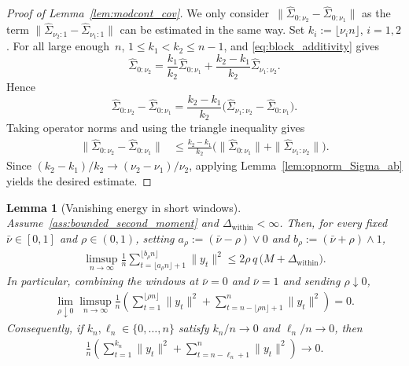 \documentclass[10pt, letterpaper]{amsart}
\newtheorem{lem}[theorem]{Lemma}
\begin{document}
\begin{proof}[Proof of Lemma~\ref{lem:modcont_cov}]
We only consider~$ \|\widehat\Sigma_{0:\nu_2 }-\widehat\Sigma_{0: \nu_1 } \|$ as the term $\|\widehat\Sigma_{\nu_2:1}-\widehat\Sigma_{\nu_1 :1} \|$ can be estimated in the same way.
Set $k_i:=\lfloor\nu_i n\rfloor$, $i=1,2$. For all large enough~$n$,
$1\leq k_1<k_2\leq n-1$, and  \eqref{eq:block_additivity} gives
\[
\widehat\Sigma_{0: \nu_2}
=
\frac{k_1}{k_2}\widehat\Sigma_{0: \nu_1}
+\frac{k_2-k_1}{k_2}\widehat\Sigma_{\nu_1:\nu_2}.
\]
Hence
\[
\widehat\Sigma_{0: \nu_2}-\widehat\Sigma_{0: \nu_1}
=
\frac{k_2-k_1}{k_2}
\Big(\widehat\Sigma_{\nu_1:\nu_2}-\widehat\Sigma_{0: \nu_1}\Big).
\]
Taking operator norms and using the triangle inequality gives
\begin{align}
\big\|\widehat\Sigma_{0: \nu_2}-\widehat\Sigma_{0:  \nu_1}\big\|
& \leq
\frac{k_2-k_1}{k_2}\Big(\|\widehat\Sigma_{0: \nu_1}\|+\|\widehat\Sigma_{\nu_1:\nu_2}\|\Big).
\end{align}
Since $(k_2-k_1)/k_2\to(\nu_2-\nu_1)/\nu_2$, applying
Lemma~\ref{lem:opnorm_Sigma_ab} yields the desired estimate.
\end{proof}

\begin{lem}[Vanishing energy in short windows]\label{lem:boundary_energy}
Assume~\ref{ass:bounded_second_moment} and $\Delta_{\mathrm{within}}<\infty$. Then, for every fixed $\bar\nu\in[0,1]$ and $\rho\in(0,1)$, setting $a_\rho:=(\bar\nu-\rho)\vee0$ and $b_\rho:=(\bar\nu+\rho)\wedge1$,
\begin{align}\label{eq:local_energy}
\limsup_{n\to\infty}
\frac1n\sum_{t=\lfloor a_\rho n\rfloor+1}^{\lfloor b_\rho n\rfloor}\|y_t\|^2
\leq 2\rho\,q\,\big(M+\Delta_{\mathrm{within}}\big).
\end{align}
In particular, combining the windows at $\bar\nu=0$ and $\bar\nu=1$ and sending $\rho\downarrow0$,
\begin{align}\label{eq:boundary_energy}
\lim_{\rho\downarrow0}\limsup_{n\to\infty}
\frac1n\left(\sum_{t=1}^{\lfloor \rho n\rfloor}\|y_t\|^2
+\sum_{t=n-\lfloor \rho n\rfloor+1}^{n}\|y_t\|^2\right)=0.
\end{align}
Consequently, if $k_n,\ell_n\in\{0,\ldots,n\}$ satisfy
$k_n/n\to0$ and $\ell_n/n\to0$, then
\begin{align}\label{eq:boundary_energy_sequential}
\frac1n\left(
\sum_{t=1}^{k_n}\|y_t\|^2
+\sum_{t=n-\ell_n+1}^{n}\|y_t\|^2
\right)\longrightarrow0.
\end{align}
\end{lem}
\end{document}
